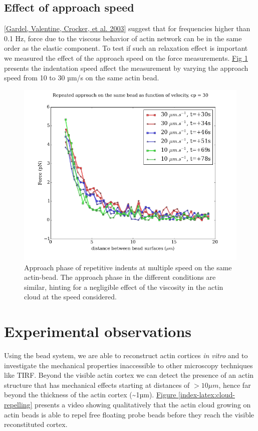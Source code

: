 \documentclass[A4paperpaper,11pt,english]{sphinxmanual}
\begin{document}
\subsection{Effect of approach speed}
\label{index-latex:effect-of-approach-speed}
{\hyperref[index-latex:gardel2003]{{[}Gardel, Valentine, Crocker,  et al.  2003{]}}} suggest that for frequencies higher than 0.1 Hz, force due to
the viscous behavior  of actin network can be in the same order as the elastic
component. To test if such an relaxation effect is important we measured the effect of the
approach speed on the force measurements. \hyperref[index-latex:many-speed]{Fig  \ref*{index-latex:many-speed}} presents the
indentation speed affect the measurement by varying the approach speed from 10
to 30 µm/s on the same actin bead.
\begin{figure}[htbp]
\centering
\capstart

\includegraphics[width=0.600\linewidth]{many_speed.png}
\caption{Approach phase of repetitive indents at multiple speed on the same
actin-bead. The approach phase in the different conditions are similar,
hinting for a negligible effect of the viscosity  in the actin cloud at the
speed considered.}\label{index-latex:many-speed}\end{figure}


\section{Experimental observations}
\label{index-latex:experimental-observations}
Using the bead system, we are able to reconstruct actin cortices \emph{in vitro} and
to investigate the mechanical properties inaccessible to other microscopy
techniques like TIRF. Beyond the visible actin cortex we can detect the
presence of an actin structure that has mechanical effects starting at
distances of \(> 10\mu{}m\), hence far beyond the thickness of the actin cortex (\textasciitilde{}1µm).
\hyperref[index-latex:cloud-repelling]{Figure  \ref*{index-latex:cloud-repelling}} presents a video showing qualitatively that the actin cloud growing
on actin beads is able to repel free floating probe beads before they reach the
visible reconstituted cortex.
\end{document}
